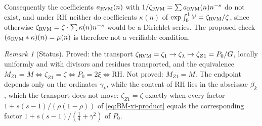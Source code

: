 \documentclass[11pt,reqno]{amsart}
\numberwithin{equation}{section}
\theoremstyle{plain}
\theoremstyle{definition}
\theoremstyle{remark}
\newtheorem{remark}[theorem]{Remark}
\theoremstyle{plain}
\begin{document}
Consequently the coefficients $a_{\rm RVM}(n)$ with
$1/\zeta_{\rm RVM}=\sum a_{\rm RVM}(n)n^{-s}$ do not exist, and under RH
neither do coefficients $\kappa(n)$ of $\exp\int_0^1\mathcal V=\zeta_{\rm RVM}/\zeta$,
since otherwise $\zeta_{\rm RVM}=\zeta\cdot\sum\kappa(n)n^{-s}$ would be a
Dirichlet series.  The proposed check
$(a_{\rm RVM}*\kappa)(n)=\mu(n)$ is therefore not a verifiable condition.

\begin{remark}[Status]\label{rem:BM-status}
Proved: the transport
$\zeta_{\rm RVM}=\zeta_1\to\zeta_\lambda\to\zeta_{Z1}=P_0/G$, locally
uniformly and with divisors and residues transported, and the equivalence
$M_{Z1}=M\iff\zeta_{Z1}=\zeta\iff P_0=2\xi\iff\mathrm{RH}$.  Not proved:
$M_{Z1}=M$.  The endpoint depends only on the ordinates $\gamma_k$, while
the content of RH lies in the abscissae $\beta_k$, which the transport does
not move: $\zeta_{Z1}=\zeta$ exactly when every factor
$1+s(s-1)/(\rho(1-\rho))$ of \eqref{eq:BM-xi-product} equals the
corresponding factor $1+s(s-1)/(\tfrac14+\gamma^2)$ of $P_0$.
\end{remark}
\end{document}
